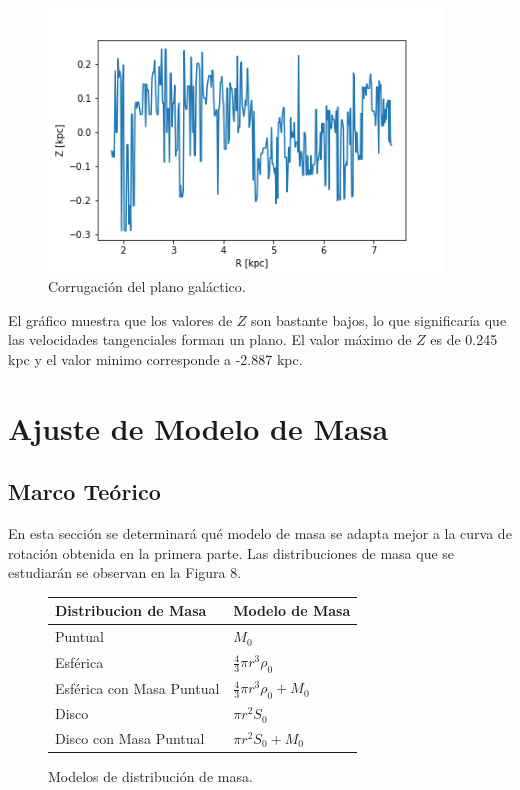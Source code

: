 \documentclass[letterpaper,oneside]{article}
\begin{document}
\begin{figure}
  \centering
  \includegraphics[height=7cm]{../graficos/corr.png}
  \caption{Corrugación del plano galáctico.}
\end{figure}

El gráfico muestra que los valores de $Z$ son bastante bajos, lo que significaría que las velocidades tangenciales forman un plano. El valor máximo de $Z$ es de 0.245 kpc y el valor minimo corresponde a -2.887 kpc.

\section{Ajuste de Modelo de Masa}
\subsection{Marco Teórico}
En esta sección se determinará qué modelo de masa se adapta mejor a la curva de rotación obtenida en la primera parte. Las distribuciones de masa que se estudiarán se observan en la Figura 8.

\begin{figure}
    \begin{tabular}{| l | l|}
     \hline
    Distribucion de Masa      & Modelo de Masa  \\ \hline
    Puntual 	              &	$M_0$	\\
    Esférica                  &	$\frac{4}{3}\pi r^{3} \rho_0$	\\
    Esférica con Masa Puntual &	$\frac{4}{3}\pi r^{3} \rho_0 + M_0$	\\
    Disco       	          &	$\pi r^{2}S_0$	\\
    Disco con Masa Puntual    &	$\pi r^{2}S_0 + M_0$	\\
    \hline
    \end{tabular}
    \caption{Modelos de distribución de masa.}
\end{figure}
\end{document}
